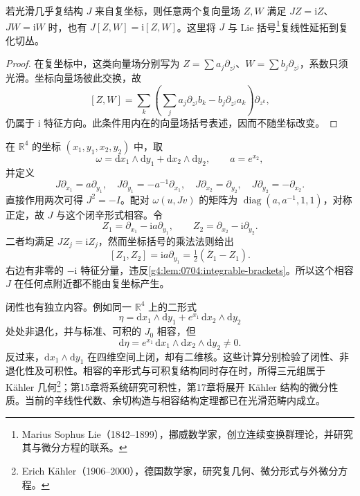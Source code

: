 \begin{lemma}\label{g4:lem:0704:integrable-brackets}
	若光滑几乎复结构 \(J\) 来自复坐标，则任意两个复向量场 \(Z,W\) 满足 \(JZ=\mathrm{i}Z\)、\(JW=\mathrm{i}W\) 时，也有 \(J[Z,W]=\mathrm{i}[Z,W]\)。这里将 \(J\) 与 Lie 括号\footnote{Marius Sophus Lie（1842--1899），挪威数学家，创立连续变换群理论，并研究其与微分方程的联系。}复线性延拓到复化切丛。
\end{lemma}
\begin{proof}
	在复坐标中，这类向量场分别写为 \(Z=\sum a_j\partial_{z^j}\)、\(W=\sum b_j\partial_{z^j}\)，系数只须光滑。坐标向量场彼此交换，故
	\[
		[Z,W]=\sum_k\left(\sum_j a_j\partial_{z^j}b_k-b_j\partial_{z^j}a_k\right)\partial_{z^k},
	\]
	仍属于 \(\mathrm{i}\) 特征方向。此条件用内在的向量场括号表述，因而不随坐标改变。
\end{proof}

\begin{example}\label{g4:exm:0704:nonintegrable-compatible}
	在 \(\mathbb R^4\) 的坐标 \((x_1,y_1,x_2,y_2)\) 中，取
	\[
		\omega=\mathrm{d}x_1\wedge\mathrm{d}y_1+\mathrm{d}x_2\wedge\mathrm{d}y_2,
		\qquad a=e^{x_2},
	\]
	并定义
	\[
		J\partial_{x_1}=a\partial_{y_1},\quad
		J\partial_{y_1}=-a^{-1}\partial_{x_1},\quad
		J\partial_{x_2}=\partial_{y_2},\quad
		J\partial_{y_2}=-\partial_{x_2}.
	\]
	直接作用两次可得 \(J^2=-I\)。配对 \(\omega(u,Jv)\) 的矩阵为 \(\operatorname{diag}(a,a^{-1},1,1)\)，对称正定，故 \(J\) 与这个闭辛形式相容。令
	\[
		Z_1=\partial_{x_1}-\mathrm{i}a\partial_{y_1},\qquad
		Z_2=\partial_{x_2}-\mathrm{i}\partial_{y_2}.
	\]
	二者均满足 \(JZ_j=\mathrm{i}Z_j\)，然而坐标括号的乘法法则给出
	\[
		[Z_1,Z_2]=\mathrm{i}a\partial_{y_1}
		=\tfrac12(\overline Z_1-Z_1).
	\]
	右边有非零的 \(-\mathrm{i}\) 特征分量，违反\cref{g4:lem:0704:integrable-brackets}。所以这个相容 \(J\) 在任何点附近都不能由复坐标产生。
\end{example}

闭性也有独立内容。例如同一 \(\mathbb R^4\) 上的二形式
\[
	\eta=\mathrm{d}x_1\wedge\mathrm{d}y_1+e^{x_1}\,\mathrm{d}x_2\wedge\mathrm{d}y_2
\]
处处非退化，并与标准、可积的 \(J_0\) 相容，但
\[
	\mathrm{d}\eta=e^{x_1}\,\mathrm{d}x_1\wedge\mathrm{d}x_2\wedge\mathrm{d}y_2\ne0.
\]
反过来，\(\mathrm{d}x_1\wedge\mathrm{d}y_1\) 在四维空间上闭，却有二维核。这些计算分别检验了闭性、非退化性及可积性。相容的辛形式与可积复结构同时存在时，所得三元组属于 Kähler 几何\footnote{Erich Kähler（1906--2000），德国数学家，研究复几何、微分形式与外微分方程。}；第15章将系统研究可积性，第17章将展开 Kähler 结构的微分性质。当前的辛线性代数、余切构造与相容结构定理都已在光滑范畴内成立。
